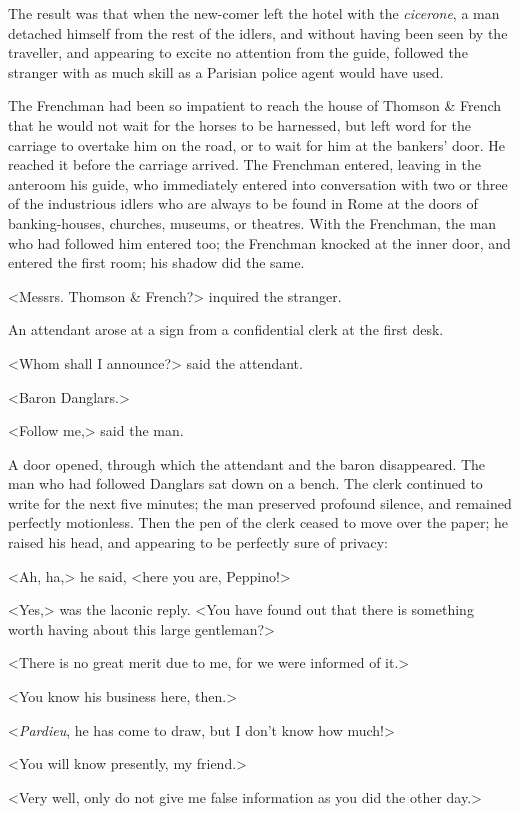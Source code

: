  The result was that when the new-comer left the hotel with the \textit{cicerone}, a man detached himself from the rest of the idlers, and without having been seen by the traveller, and appearing to excite no attention from the guide, followed the stranger with as much skill as a Parisian police agent would have used. 

 The Frenchman had been so impatient to reach the house of Thomson \& French that he would not wait for the horses to be harnessed, but left word for the carriage to overtake him on the road, or to wait for him at the bankers' door. He reached it before the carriage arrived. The Frenchman entered, leaving in the anteroom his guide, who immediately entered into conversation with two or three of the industrious idlers who are always to be found in Rome at the doors of banking-houses, churches, museums, or theatres. With the Frenchman, the man who had followed him entered too; the Frenchman knocked at the inner door, and entered the first room; his shadow did the same. 

 <Messrs. Thomson \& French?> inquired the stranger. 

 An attendant arose at a sign from a confidential clerk at the first desk. 

 <Whom shall I announce?> said the attendant. 

 <Baron Danglars.> 

 <Follow me,> said the man. 

 A door opened, through which the attendant and the baron disappeared. The man who had followed Danglars sat down on a bench. The clerk continued to write for the next five minutes; the man preserved profound silence, and remained perfectly motionless. Then the pen of the clerk ceased to move over the paper; he raised his head, and appearing to be perfectly sure of privacy: 

 <Ah, ha,> he said, <here you are, Peppino!> 

 <Yes,> was the laconic reply. <You have found out that there is something worth having about this large gentleman?> 

 <There is no great merit due to me, for we were informed of it.> 

 <You know his business here, then.> 

 <\textit{Pardieu}, he has come to draw, but I don't know how much!> 

 <You will know presently, my friend.> 

 <Very well, only do not give me false information as you did the other day.> 

